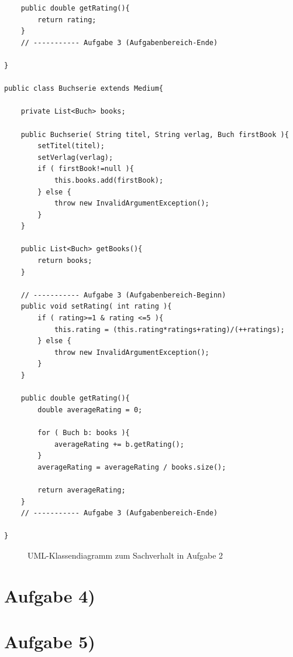 \documentclass{swp1}
\begin{document}
\begin{lstlisting}
	public double getRating(){
		return rating;
	}
	// ----------- Aufgabe 3 (Aufgabenbereich-Ende)
	
}

public class Buchserie extends Medium{
	
	private List<Buch> books;
	
	public Buchserie( String titel, String verlag, Buch firstBook ){
		setTitel(titel);
		setVerlag(verlag);
		if ( firstBook!=null ){
			this.books.add(firstBook);
		} else {
			throw new InvalidArgumentException();
		}
	}
	
	public List<Buch> getBooks(){
		return books;
	}
	
	// ----------- Aufgabe 3 (Aufgabenbereich-Beginn)
	public void setRating( int rating ){
		if ( rating>=1 & rating <=5 ){
			this.rating = (this.rating*ratings+rating)/(++ratings);
		} else {
			throw new InvalidArgumentException();
		}
	}
	
	public double getRating(){
		double averageRating = 0;
		
		for ( Buch b: books ){
			averageRating += b.getRating();
		}
		averageRating = averageRating / books.size();
		
		return averageRating;
	}
	// ----------- Aufgabe 3 (Aufgabenbereich-Ende)
	
}
\end{lstlisting}

\begin{figure}[h]
\caption{UML-Klassendiagramm zum Sachverhalt in Aufgabe 2}
\label{ab3}
\end{figure}

\section*{Aufgabe 4)}
\section*{Aufgabe 5)}
\end{document}
